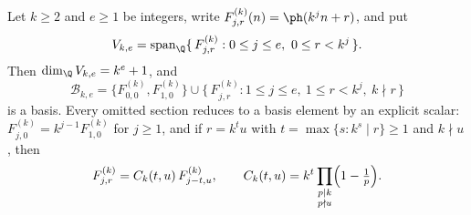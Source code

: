 \begin{theorem}
\label{thm:kkernelrank}
Let $k\ge2$ and $e\ge1$ be integers, write $F^{(k)}_{j,r}(n)=\ph(k^jn+r)$, and put
\[
 V_{k,e}=\operatorname{span}_{\Q}
 \{\,F^{(k)}_{j,r}:0\le j\le e,\ 0\le r<k^j\,\}.
\]
Then $\dim_{\Q}V_{k,e}=k^e+1$, and
\[
 \mathcal B_{k,e}
 =\{F^{(k)}_{0,0},F^{(k)}_{1,0}\}
 \cup\{\,F^{(k)}_{j,r}:1\le j\le e,\ 1\le r<k^j,\ k\nmid r\,\}
\]
is a basis.  Every omitted section reduces to a basis element by an explicit
scalar: $F^{(k)}_{j,0}=k^{j-1}F^{(k)}_{1,0}$ for $j\ge1$, and if $r=k^tu$ with
$t=\max\{s:k^s\mid r\}\ge1$ and $k\nmid u$, then
\[
 F^{(k)}_{j,r}=C_k(t,u)\,F^{(k)}_{j-t,u},
 \qquad
 C_k(t,u)=k^t\prod_{\substack{p\mid k\\ p\nmid u}}\Bigl(1-\tfrac1p\Bigr).
\]
\end{theorem}
